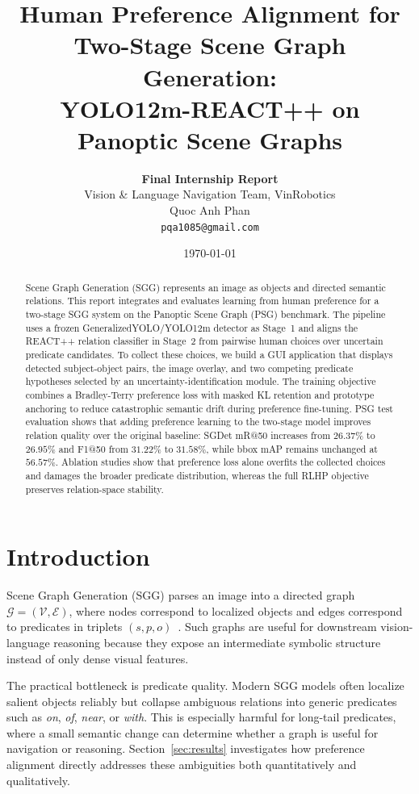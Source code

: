 \documentclass[10pt,twocolumn,letterpaper]{article}
\title{\textbf{Human Preference Alignment for Two-Stage Scene Graph Generation:\\YOLO12m-REACT++ on Panoptic Scene Graphs}}
\author{
    \textbf{Final Internship Report} \\
    Vision \& Language Navigation Team, VinRobotics \\
    Quoc Anh Phan \\
    {\small\texttt{pqa1085@gmail.com}}
}
\date{\today}
\begin{document}
\maketitle

\begin{abstract}
Scene Graph Generation (SGG) represents an image as objects and directed semantic relations. This report integrates and evaluates learning from human preference for a two-stage SGG system on the Panoptic Scene Graph (PSG) benchmark. The pipeline uses a frozen GeneralizedYOLO/YOLO12m detector as Stage~1 and aligns the REACT++ relation classifier in Stage~2 from pairwise human choices over uncertain predicate candidates. To collect these choices, we build a GUI application that displays detected subject-object pairs, the image overlay, and two competing predicate hypotheses selected by an uncertainty-identification module. The training objective combines a Bradley-Terry preference loss with masked KL retention and prototype anchoring to reduce catastrophic semantic drift during preference fine-tuning. PSG test evaluation shows that adding preference learning to the two-stage model improves relation quality over the original baseline: SGDet mR@50 increases from $26.37\%$ to $26.95\%$ and F1@50 from $31.22\%$ to $31.58\%$, while bbox mAP remains unchanged at $56.57\%$. Ablation studies show that preference loss alone overfits the collected choices and damages the broader predicate distribution, whereas the full RLHP objective preserves relation-space stability.
\end{abstract}

\section{Introduction}
\label{sec:intro}

Scene Graph Generation (SGG) parses an image into a directed graph $\mathcal{G}=(\mathcal{V},\mathcal{E})$, where nodes correspond to localized objects and edges correspond to predicates in triplets $(s,p,o)$~\cite{krishna2017visual,yang2022psg}. Such graphs are useful for downstream vision-language reasoning because they expose an intermediate symbolic structure instead of only dense visual features.

The practical bottleneck is predicate quality. Modern SGG models often localize salient objects reliably but collapse ambiguous relations into generic predicates such as \textit{on}, \textit{of}, \textit{near}, or \textit{with}. This is especially harmful for long-tail predicates, where a small semantic change can determine whether a graph is useful for navigation or reasoning. Section~\ref{sec:results} investigates how preference alignment directly addresses these ambiguities both quantitatively and qualitatively.
\end{document}
